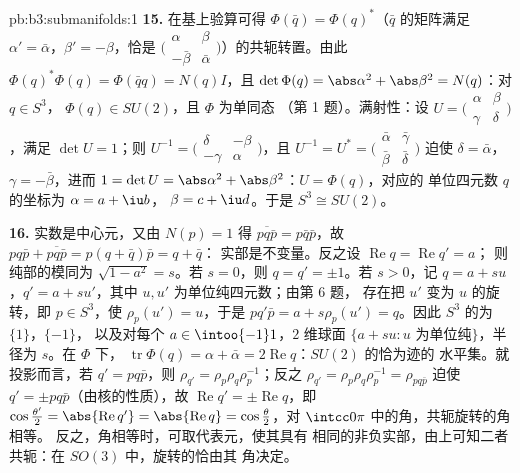 \begin{solution}{pb:b3:submanifolds:1}
\textbf{15.} 在基上验算可得 $\Phi(\bar q) =
\Phi(q)^*$（$\bar q$ 的矩阵满足 $\alpha' =
\bar\alpha$，$\beta' = -\beta$，恰是
$\bigl(\begin{smallmatrix}\alpha & \beta\\
-\bar\beta & \bar\alpha\end{smallmatrix}\bigr)$）的共轭转置。由此
$\Phi(q)^*\Phi(q) = \Phi(\bar qq) = N(q)I$，且 $\det\Phi(q)
= \abs\alpha^2 + \abs\beta^2 = N(q)$：对 $q \in S^3$，
$\Phi(q) \in SU(2)$，且 $\Phi$ 为单同态
（第 1 题）。满射性：设 $U =
\bigl(\begin{smallmatrix}\alpha & \beta\\ \gamma &
\delta\end{smallmatrix}\bigr)$，满足 $\det U = 1$；则
$U^{-1} = \bigl(\begin{smallmatrix}\delta & -\beta\\
-\gamma & \alpha\end{smallmatrix}\bigr)$，且 $U^{-1} = U^*
= \bigl(\begin{smallmatrix}\bar\alpha & \bar\gamma\\
\bar\beta & \bar\delta\end{smallmatrix}\bigr)$ 迫使
$\delta = \bar\alpha$，$\gamma = -\bar\beta$，进而 $1 =
\det U = \abs\alpha^2 + \abs\beta^2$：$U = \Phi(q)$，对应的
单位四元数 $q$ 的坐标为 $\alpha = a + \iu b$，
$\beta = c + \iu d$。于是 $S^3 \cong SU(2)$。

\textbf{16.} 实数是中心元，又由 $N(p) = 1$ 得
$\overline{pq\bar p} = p\bar q\bar p$，故 $pq\bar p +
\overline{pq\bar p} = p(q + \bar q)\bar p = q + \bar q$：
实部是不变量。反之设
$\operatorname{Re}q = \operatorname{Re}q' = a$；
则纯部的模同为 $\sqrt{1 - a^2} = s$。若 $s =
0$，则 $q = q' = \pm1$。若 $s > 0$，记 $q = a + su$，$q' =
a + su'$，其中 $u, u'$ 为单位纯四元数；由第 6 题，
存在把 $u'$ 变为 $u$ 的旋转，即 $p \in S^3$，使
$\rho_p(u') = u$，于是 $pq'\bar p = a + s\rho_p(u') =
q$。因此 $S^3$ 的为 $\{1\}$，$\{-1\}$，
以及对每个 $a \in \intoo{-1}1$，$2$ 维球面 $\{a + su :
u \text{ 为单位纯}\}$，半径为 $s$。在 $\Phi$ 下，
$\operatorname{tr}\Phi(q) = \alpha + \bar\alpha =
2\operatorname{Re}q$：$SU(2)$ 的恰为迹的
水平集。就投影而言，若 $q' = pq\bar p$，则
$\rho_{q'} = \rho_p\rho_q\rho_p^{-1}$；反之
$\rho_{q'} = \rho_p\rho_q\rho_p^{-1} = \rho_{pq\bar p}$
迫使 $q' = \pm pq\bar p$（由核的性质），故
$\operatorname{Re}q' = \pm\operatorname{Re}q$，即
$\cos\frac{\theta'}2 = \abs{\operatorname{Re}q'} =
\abs{\operatorname{Re}q} = \cos\frac\theta2$，对
$\intcc0\pi$ 中的角，共轭旋转的角相等。
反之，角相等时，可取代表元，使其具有
相同的非负实部，由上可知二者共轭：在
$SO(3)$ 中，旋转的恰由其
角决定。


\end{solution}
